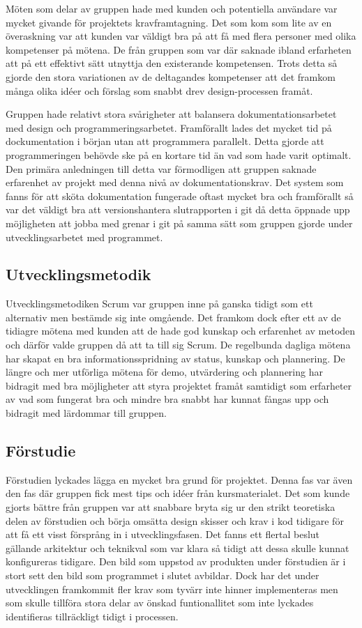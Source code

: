 Möten som delar av gruppen hade med kunden och potentiella användare var mycket givande för projektets kravframtagning. Det som kom som lite av en överaskning var att kunden var väldigt bra på att få med flera personer med olika kompetenser på mötena. De från gruppen som var där saknade ibland erfarheten att på ett effektivt sätt utnyttja den existerande kompetensen.
Trots detta så gjorde den stora variationen av de deltagandes kompetenser att det framkom många olika idéer och förslag som snabbt drev design-processen framåt.

Gruppen hade relativt stora svårigheter att balansera dokumentationsarbetet med design och programmeringsarbetet. Framförallt lades det mycket tid på dockumentation i början utan att programmera parallelt. Detta gjorde att programmeringen behövde ske på en kortare tid än vad som hade varit optimalt. Den primära anledningen till detta var förmodligen att gruppen saknade erfarenhet av projekt med denna nivå av dokumentationskrav. Det system som fanns för att sköta dokumentation fungerade oftast mycket bra och framförallt så var det väldigt bra att versionshantera slutrapporten i git då detta öppnade upp möjligheten att jobba med grenar i git på samma sätt som gruppen gjorde under utvecklingsarbetet med programmet.

\subsection{Utvecklingsmetodik}
Utvecklingsmetodiken Scrum var gruppen inne på ganska tidigt som ett alternativ men bestämde sig inte omgående. Det framkom dock efter ett av de tidiagre mötena med kunden att de hade god kunskap och erfarenhet av metoden och därför valde gruppen då att ta till sig Scrum. De regelbunda dagliga mötena har skapat en bra informationsspridning av status, kunskap och plannering. De längre och mer utförliga mötena för demo, utvärdering och plannering har bidragit med bra möjligheter att styra projektet framåt samtidigt som erfarheter av vad som fungerat bra och mindre bra snabbt har kunnat fångas upp och bidragit med lärdommar till gruppen.

\subsection{Förstudie}
Förstudien lyckades lägga en mycket bra grund för projektet. Denna fas var även den fas där gruppen fick mest tips och idéer från kursmaterialet. Det som kunde gjorts bättre från gruppen var att snabbare bryta sig ur den strikt teoretiska delen av förstudien och börja omsätta design skisser och krav i kod tidigare för att få ett visst försprång in i utvecklingsfasen. Det fanns ett flertal beslut gällande arkitektur och teknikval som var klara så tidigt att dessa skulle kunnat konfigureras tidigare. Den bild som uppstod av produkten under förstudien är i stort sett den bild som programmet i slutet avbildar. Dock har det under utvecklingen framkommit fler krav som tyvärr inte hinner implementeras men som skulle tillföra stora delar av önskad funtionallitet som inte lyckades identifieras tillräckligt tidigt i processen.

